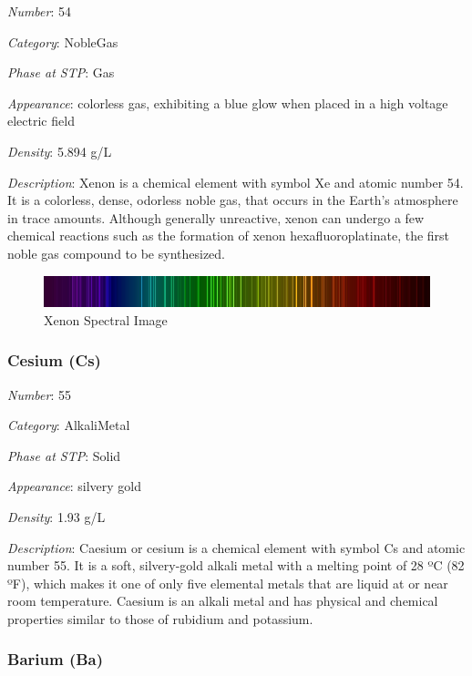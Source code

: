 \documentclass{article}
\begin{document}
\textit{Number}: 54

\textit{Category}: NobleGas

\textit{Phase at STP}: Gas

\textit{Appearance}: colorless gas, exhibiting a blue glow when placed in a high voltage electric field

\textit{Density}: 5.894 g/L

\textit{Description}: Xenon is a chemical element with symbol Xe and atomic number 54. It is a colorless, dense, odorless noble gas, that occurs in the Earth's atmosphere in trace amounts. Although generally unreactive, xenon can undergo a few chemical reactions such as the formation of xenon hexafluoroplatinate, the first noble gas compound to be synthesized.

\immediate{}
\begin{figure}[!ht]
    \centering
    \includegraphics[width=12cm]{./resources/spectral_img/Xenon_Spectrum.jpg}
    \caption{Xenon Spectral Image}
\end{figure}

\hypertarget{subsubsection::Cs}{}\subsubsection{Cesium (Cs)}

\textit{Number}: 55

\textit{Category}: AlkaliMetal

\textit{Phase at STP}: Solid

\textit{Appearance}: silvery gold

\textit{Density}: 1.93 g/L

\textit{Description}: Caesium or cesium is a chemical element with symbol Cs and atomic number 55. It is a soft, silvery-gold alkali metal with a melting point of 28 ºC (82 ºF), which makes it one of only five elemental metals that are liquid at or near room temperature. Caesium is an alkali metal and has physical and chemical properties similar to those of rubidium and potassium.

\hypertarget{subsubsection::Ba}{}\subsubsection{Barium (Ba)}
\end{document}
